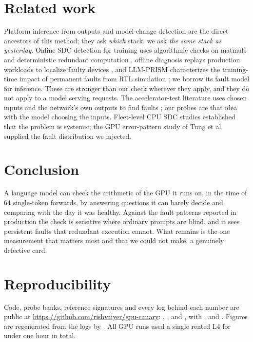 \documentclass[11pt]{article}
\begin{document}
\section{Related work}

Platform inference from outputs \citep{zhang2024hspi,wimbauer2026fingerprinting} and model-change detection \citep{chauvin2026b3it} are the direct ancestors of this method; they ask \emph{which} stack, we ask \emph{the same stack as yesterday}. Online SDC detection for training uses algorithmic checks on matmuls and deterministic redundant computation \citep{lei2026aegis,altenbernd2026sdc}, offline diagnosis replays production workloads to localize faulty devices \citep{zheng2026sdcwild}, and LLM-PRISM characterizes the training-time impact of permanent faults from RTL simulation \citep{tyagi2026prism}; we borrow its fault model for inference. These are stronger than our check wherever they apply, and they do not apply to a model serving requests. The accelerator-test literature uses chosen inputs and the network's own outputs to find faults \citep{li2017errorprop,chaudhuri2023testing}; our probes are that idea with the model choosing the inputs. Fleet-level CPU SDC studies \citep{dixit2021sdc,hochschild2021cores} established that the problem is systemic; the GPU error-pattern study of Tung et al.\ \citep{tung2026anatomy} supplied the fault distribution we injected.

\section{Conclusion}

A language model can check the arithmetic of the GPU it runs on, in the time of 64 single-token forwards, by answering questions it can barely decide and comparing with the day it was healthy. Against the fault patterns reported in production the check is sensitive where ordinary prompts are blind, and it sees persistent faults that redundant execution cannot. What remains is the one measurement that matters most and that we could not make: a genuinely defective card.

\section*{Reproducibility}
\begin{sloppypar}
Code, probe banks, reference signatures and every log behind each number are public at \url{https://github.com/rishvaiyer/gpu-canary}: , ,  and , with ,  and . Figures are regenerated from the logs by . All GPU runs used a single rented L4 for under one hour in total.
\end{sloppypar}



\end{document}
